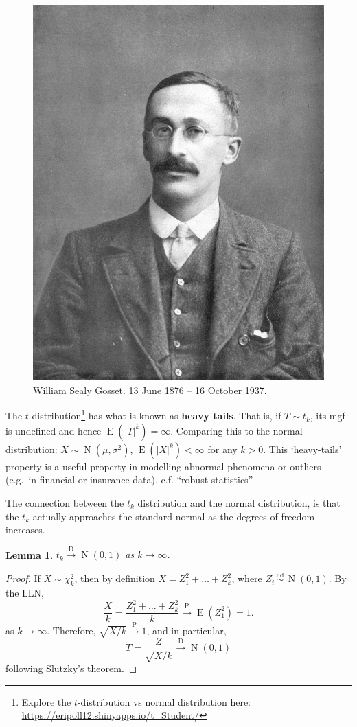 \documentclass[
]{book}
\DeclareMathOperator{\E}{E}
\DeclareMathOperator{\N}{N}
\newcommand{\iid}{\,\overset{\text{iid}}{\sim}\,}
\newtheorem{lemma}{Lemma}[chapter]
\theoremstyle{definition}
\theoremstyle{definition}
\theoremstyle{definition}
\theoremstyle{definition}
\theoremstyle{remark}
\begin{document}
\begin{figure}

{\centering \includegraphics[width=0.6\linewidth]{figure/student} 

}

\caption{William Sealy Gosset. 13 June 1876 -- 16 October 1937.}\label{fig:student}
\end{figure}

The \(t\)-distribution\footnote{Explore the \(t\)-distribution vs normal distribution here:
  \url{https://eripoll12.shinyapps.io/t_Student/}} has what is known as \textbf{heavy tails}.
That is, if \(T\sim t_k\), its mgf is undefined and hence \(\E(|T|^k) = \infty\).
Comparing this to the normal distribution:
\(X\sim\N(\mu,\sigma^2)\), \(\E(|X|^k) < \infty\) for any \(k>0\).
This `heavy-tails' property is a useful property in modelling
abnormal phenomena or outliers (e.g.~in financial or insurance data).
c.f. ``robust statistics''

The connection between the \(t_k\) distribution and the normal distribution, is that the \(t_k\) actually approaches the standard normal as the degrees of freedom increases.

\begin{lemma}
\(t_k \xrightarrow{\text{D}} \N(0,1)\) as \(k\to\infty\).
\end{lemma}

\begin{proof}
If \(X\sim\chi^2_k\), then by definition
\(X = Z_1^2 + \dots + Z_k^2\), where \(Z_i\iid\N(0,1)\). By the LLN,
\[\frac{X}{k} = \frac{Z_1^2 + \dots + Z_k^2}{k} \xrightarrow{\text{P}} \E(Z_1^2) = 1.\]
as \(k\to\infty\). Therefore, \(\sqrt{X/k} \xrightarrow{\text{P}} 1\), and
in particular,
\[T = \frac{Z}{\sqrt{X/k}} \xrightarrow{\text{D}} \N(0,1)\]
following Slutzky's theorem.
\end{proof}
\end{document}
